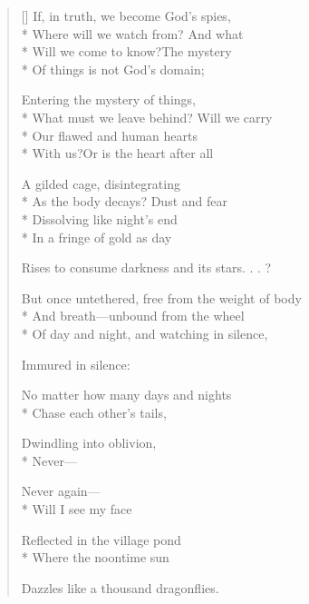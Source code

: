 \label{ch:lear_bl}
\settowidth{\versewidth}{But once untethered, free from the weight of body}
\begin{verse}[\versewidth]
 If, in truth, we become God's spies,\\*
Where will we watch from?   And what\\*
Will we come to know?\qquad The mystery\\*
Of things is not God's domain;

Entering the mystery of things,\\*
What must we leave behind?  Will we carry\\*
Our flawed and human hearts\\*
With us?\qquad Or is the heart after all

A gilded cage, disintegrating\\*
As the body decays?   Dust and fear\\*
Dissolving like night's end\\*
In a fringe of gold as day

Rises to consume darkness and its stars. . . ?

But once untethered, free from the weight of body\\*
And breath---unbound from the wheel\\*
Of day and night, and watching in silence,

Immured in silence:

No matter how many days and nights\\*
Chase each other's tails,

Dwindling into oblivion,\\*
Never---

Never again---\\*
Will I see my face

Reflected in the village pond\\*
Where the noontime sun

Dazzles like a thousand dragonflies.
\end{verse}
